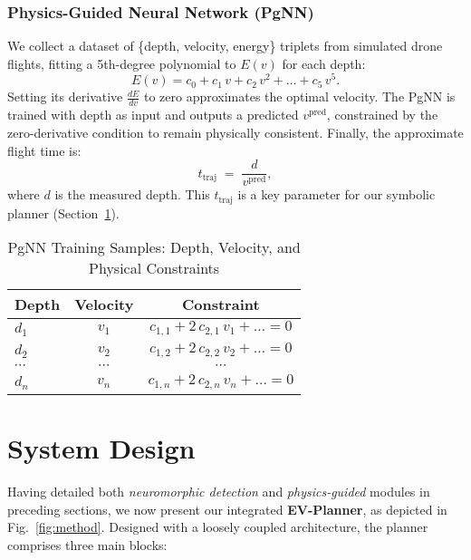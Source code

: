 \subsubsection{Physics-Guided Neural Network (PgNN)}

We collect a dataset of \{depth, velocity, energy\} triplets from simulated drone flights, fitting a 5th-degree polynomial to $E(v)$ for each depth:
\[
E(v) = c_0 + c_1\,v + c_2\,v^2 + \ldots + c_5\,v^5.
\]
Setting its derivative $\tfrac{dE}{dv}$ to zero approximates the optimal velocity. The PgNN is trained with depth as input and outputs a predicted $v^{\mathrm{pred}}$, constrained by the zero-derivative condition to remain physically consistent. Finally, the approximate flight time is:
\begin{equation}
\label{eq:ttraj}
    t_{\mathrm{traj}} \;=\; \frac{d}{v^{\mathrm{pred}}},
\end{equation}
where $d$ is the measured depth. This $t_{\mathrm{traj}}$ is a key parameter for our symbolic planner (Section~\ref{subsec:system_arch}).

\begin{table}[ht]
\centering
\caption{PgNN Training Samples: Depth, Velocity, and Physical Constraints}
\label{tab:data}
\begin{tabular}{@{}lcc@{}}
\toprule
\textbf{Depth} & \textbf{Velocity} & \textbf{Constraint}                  \\ \midrule
$d_1$          & $v_1$             & $c_{1,1} + 2\,c_{2,1}\,v_1 + \ldots = 0$       \\
$d_2$          & $v_2$             & $c_{1,2} + 2\,c_{2,2}\,v_2 + \ldots = 0$       \\
$\cdots$       & $\cdots$          & $\cdots$                                      \\
$d_n$          & $v_n$             & $c_{1,n} + 2\,c_{2,n}\,v_n + \ldots = 0$       \\ \bottomrule
\end{tabular}
\end{table}

\section{System Design}
\label{subsec:system_arch}


Having detailed both \emph{neuromorphic detection} and \emph{physics-guided} modules in preceding sections, we now present our integrated \textbf{EV-Planner}\cite{evplanner}, as depicted in Fig.~\ref{fig:method}. Designed with a loosely coupled architecture, the planner comprises three main blocks:

